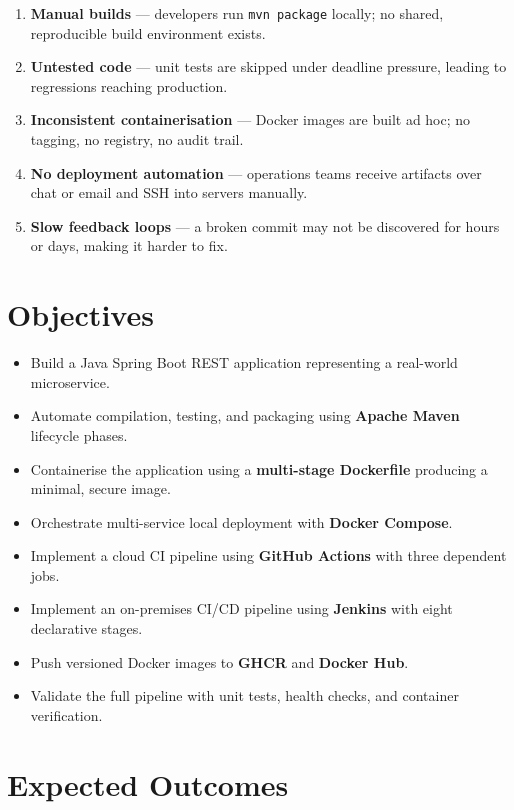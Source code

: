 \documentclass[12pt,a4paper]{report}
\begin{document}
\begin{enumerate}[leftmargin=*, label=\arabic*.]
  \item \textbf{Manual builds} — developers run \texttt{mvn package} locally; no shared, reproducible build environment exists.
  \item \textbf{Untested code} — unit tests are skipped under deadline pressure, leading to regressions reaching production.
  \item \textbf{Inconsistent containerisation} — Docker images are built ad hoc; no tagging, no registry, no audit trail.
  \item \textbf{No deployment automation} — operations teams receive artifacts over chat or email and SSH into servers manually.
  \item \textbf{Slow feedback loops} — a broken commit may not be discovered for hours or days, making it harder to fix.
\end{enumerate}

\section{Objectives}

\begin{itemize}[leftmargin=*, label=]
  \item Build a Java Spring Boot REST application representing a real-world microservice.
  \item Automate compilation, testing, and packaging using \textbf{Apache Maven} lifecycle phases.
  \item Containerise the application using a \textbf{multi-stage Dockerfile} producing a minimal, secure image.
  \item Orchestrate multi-service local deployment with \textbf{Docker Compose}.
  \item Implement a cloud CI pipeline using \textbf{GitHub Actions} with three dependent jobs.
  \item Implement an on-premises CI/CD pipeline using \textbf{Jenkins} with eight declarative stages.
  \item Push versioned Docker images to \textbf{GHCR} and \textbf{Docker Hub}.
  \item Validate the full pipeline with unit tests, health checks, and container verification.
\end{itemize}

\section{Expected Outcomes}
\end{document}

